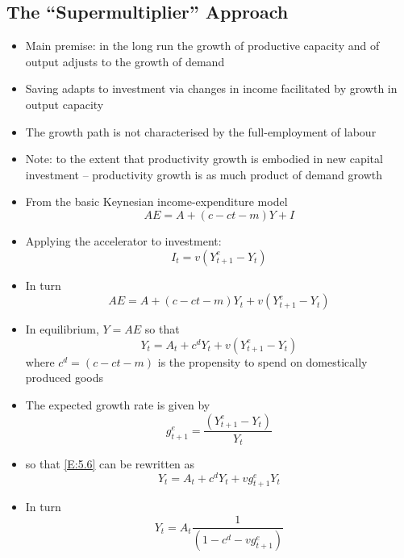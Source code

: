 \documentclass{article}
\begin{document}
\subsection{The ``Supermultiplier'' Approach}
	\begin{itemize}
		\item Main premise: in the long run the growth of productive capacity and of output adjusts to the growth of demand
		\item Saving adapts to investment via changes in income facilitated by growth in output capacity
		\item The growth path is not characterised by the full-employment of labour
		\item Note: to the extent that productivity growth is embodied in new capital investment -- productivity growth is as much  product of demand growth
		\item From the basic Keynesian income-expenditure model
		\begin{equation}
			AE = A + (c-ct-m)Y + I \label{E:5.3}
		\end{equation}
		\item Applying the accelerator to investment:
		\begin{equation}
			I_t=v(Y_{t+1}^e-Y_t) \label{E:5.4}
		\end{equation}
		\item In turn
		\begin{equation}
			AE = A + (c-ct-m)Y_t + v(Y_{t+1}^e-Y_t) \label{E:5.5}
		\end{equation}
		\item In equilibrium, \( Y=AE \) so that
		\begin{equation}
			Y_t = A_t + c^dY_t+v\left( Y_{t+1}^e-Y_t \right) \label{E:5.6}
		\end{equation}
		where \( c^d = (c-ct-m) \) is the propensity to spend on domestically produced goods
		\item The expected growth rate is given by
		\begin{equation}
			g_{t+1}^e = \frac{\left( Y_{t+1}^e-Y_t \right)}{Y_t} \label{E:5.7}
		\end{equation}
		\item so that \cref{E:5.6} can be rewritten as
		\begin{equation}
			Y_t = A_t + c^dY_t+vg_{t+1}^eY_t \label{E:5.8}
		\end{equation}
		\item In turn
		\begin{equation}
			Y_t = A_t \frac{1}{\left( 1-c^d-vg_{t+1}^e \right)} \label{E:5.9}

\end{equation}
\end{itemize}
\end{document}
